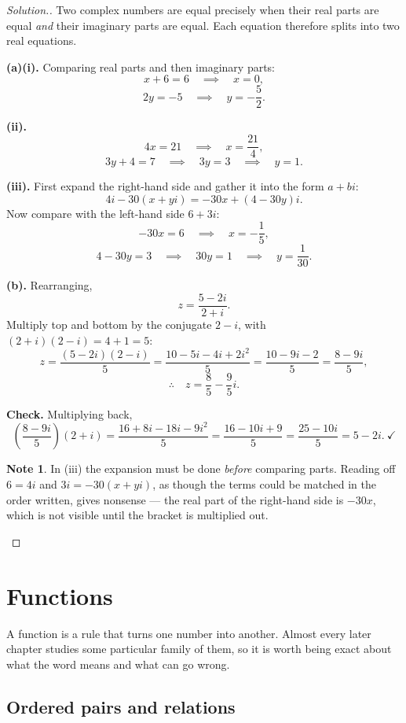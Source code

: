 \documentclass[11pt,a4paper]{article}
\theoremstyle{definition}
\newtheorem{note}[thm]{Note}
\newenvironment{solution}
  {\renewcommand{\qedsymbol}{}\begin{proof}[\textit{Solution}.]}
  {\end{proof}}
\let\amscheckmark\checkmark
\renewcommand{\checkmark}{\ensuremath{\amscheckmark}}
\begin{document}
\begin{solution}
Two complex numbers are equal precisely when their real parts are equal \emph{and} their
imaginary parts are equal. Each equation therefore splits into two real equations.

\textbf{(a)(i).} Comparing real parts and then imaginary parts:
$$x+6=6\quad\implies\quad x=0,$$
$$2y=-5\quad\implies\quad y=-\frac{5}{2}.$$

\textbf{(ii).}
$$4x=21\quad\implies\quad x=\frac{21}{4},$$
$$3y+4=7\quad\implies\quad 3y=3\quad\implies\quad y=1.$$

\textbf{(iii).} First expand the right-hand side and gather it into the form
$a+bi$:
$$4i-30(x+yi)=-30x+(4-30y)i.$$
Now compare with the left-hand side $6+3i$:
$$-30x=6\quad\implies\quad x=-\frac{1}{5},$$
$$4-30y=3\quad\implies\quad 30y=1\quad\implies\quad y=\frac{1}{30}.$$

\textbf{(b).} Rearranging,
$$z=\frac{5-2i}{2+i}.$$
Multiply top and bottom by the conjugate $2-i$, with $(2+i)(2-i)=4+1=5$:
$$z=\frac{(5-2i)(2-i)}{5}=\frac{10-5i-4i+2i^2}{5}=\frac{10-9i-2}{5}=\frac{8-9i}{5},$$
$$\therefore\quad z=\frac{8}{5}-\frac{9}{5}i.$$

\textbf{Check.} Multiplying back,
$$\left(\frac{8-9i}{5}\right)(2+i)=\frac{16+8i-18i-9i^2}{5}=\frac{16-10i+9}{5}
=\frac{25-10i}{5}=5-2i.\ \checkmark$$

\begin{note}
In (iii) the expansion must be done \emph{before} comparing parts. Reading off
$6=4i$ and $3i=-30(x+yi)$, as though the terms could be matched in the order written,
gives nonsense --- the real part of the right-hand side is $-30x$, which is not visible
until the bracket is multiplied out.
\end{note}
\end{solution}

\section{Functions}

A function is a rule that turns one number into another. Almost every later chapter
studies some particular family of them, so it is worth being exact about what the word
means and what can go wrong.

\subsection{Ordered pairs and relations}
\end{document}

